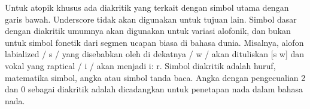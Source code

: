 	Untuk atopik khusus ada diakritik yang terkait dengan simbol utama dengan garis bawah.
	Underscore tidak akan digunakan untuk tujuan lain. Simbol dasar dengan diakritik umumnya akan digunakan untuk variasi alofonik, dan bukan untuk simbol fonetik dari segmen ucapan biasa di bahasa dunia. Misalnya, alofon labialized / s / yang disebabkan oleh di dekatnya / w / akan dituliskan [s w] dan vokal yang raptical / i / akan menjadi i: r. Simbol diakritik adalah huruf, matematika simbol, angka atau simbol tanda baca. Angka dengan pengecualian 2 dan 0 sebagai diakritik adalah dicadangkan untuk penetapan nada dalam bahasa nada.

